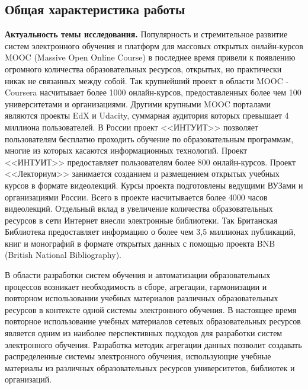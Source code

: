 \subsection*{\Large Общая характеристика работы}
\fontsize{14pt}{15pt}\selectfont


\textbf{Актуальность темы исследования.}
Популярность и стремительное развитие систем электронного обучения и платформ для массовых открытых онлайн-курсов MOOC (Massive Open Online Course) в последнее время привели к появлению огромного количества образовательных ресурсов, открытых, но практически никак не связанных между собой. Так крупнейший проект в области MOOC - Coursera насчитывает более 1000 онлайн-курсов, предоставленных более чем 100 университетами и организациями. Другими крупными MOOC порталами являются проекты EdX и Udacity, суммарная аудитория которых превышает 4 миллиона пользователей. В России проект <<ИНТУИТ>> позволяет пользователям бесплатно проходить обучение по образовательным программам, многие из которых касаются информационных технологий. Проект <<ИНТУИТ>> предоставляет пользователям более 800 онлайн-курсов. Проект <<Лекториум>> занимается созданием и размещением открытых учебных курсов в формате видеолекций. Курсы проекта подготовлены ведущими ВУЗами и организациями России. Всего в проекте насчитывается более 4000 часов видеолекций. Отдельный вклад в увеличение количества образовательных ресурсов в сети Интернет внесли электронные библиотеки. Так Британская Библиотека предоставляет информацию о более чем 3,5 миллионах публикаций, книг и монографий в формате открытых данных с помощью проекта BNB (British National Bibliography). 

В области разработки систем обучения и автоматизации образовательных процессов возникает необходимость в сборе, агрегации, гармонизации и повторном использовании учебных материалов различных образовательных ресурсов в контексте одной системы электронного обучения. В настоящее время повторное использование учебных материалов сетевых образовательных ресурсов является одним из наиболее перспективных подходов для разработки систем электронного обучения. Разработка методик агрегации данных позволит создавать распределенные системы электронного обучения, использующие учебные материалы из различных образовательных ресурсов университетов, библиотек и организаций.

